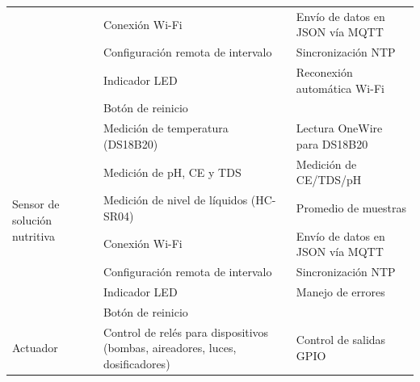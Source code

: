 \begin{table}[H]
\begin{tabular}{p{1.7cm}p{5.3cm}p{4.9cm}}
                                                          & Conexión Wi-Fi                                                                & Envío de datos en JSON vía MQTT                \\
                                                          & Configuración remota de intervalo                                             & Sincronización NTP                             \\
                                                          & Indicador LED                                                                 & Reconexión automática Wi-Fi                    \\
                                                          & Botón de reinicio                                                             &                                                \\
        \hline
        \multirow{7}{1.7cm}{Sensor de solución nutritiva} & Medición de temperatura (DS18B20)                                             & Lectura OneWire para DS18B20                   \\
                                                          & Medición de pH, CE y TDS                                                      & Medición de CE/TDS/pH                          \\
                                                          & Medición de nivel de líquidos (HC-SR04)                                       & Promedio de muestras                           \\
                                                          & Conexión Wi-Fi                                                                & Envío de datos en JSON vía MQTT                \\
                                                          & Configuración remota de intervalo                                             & Sincronización NTP                             \\
                                                          & Indicador LED                                                                 & Manejo de errores                              \\
                                                          & Botón de reinicio                                                             &                                                \\
        \hline
        \multirow{7}{1.7cm}{Actuador}                     & Control de relés para dispositivos (bombas, aireadores, luces, dosificadores) & Control de salidas GPIO                        \\

\end{tabular}
\end{table}
